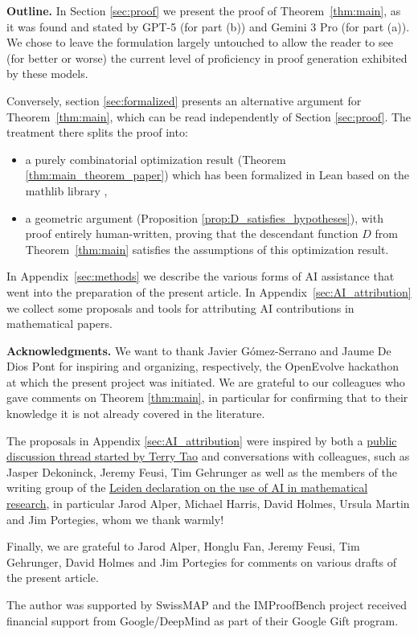 \documentclass[12pt,reqno]{amsart}
\theoremstyle{definition}
\begin{document}
\medskip
\begin{humanparagraph}
\noindent\textbf{Outline.} 
In Section \ref{sec:proof} we present the proof of Theorem~\ref{thm:main}, as it was found and stated by GPT-5 (for part (b)) and Gemini 3 Pro (for part (a)). We chose to leave the formulation largely untouched to allow the reader to see (for better or worse) the current level of proficiency in proof generation exhibited by these models.

Conversely, section \ref{sec:formalized} presents an alternative argument for Theorem~\ref{thm:main}, which can be read independently of Section \ref{sec:proof}. The treatment there splits the proof into:
\begin{itemize}
    \item a purely combinatorial optimization result (Theorem \ref{thm:main_theorem_paper}) which has been formalized in Lean \cite{lean4} based on the mathlib library \cite{mathlib},
    \item a geometric argument (Proposition  \ref{prop:D_satisfies_hypotheses}), with proof entirely human-written, proving that the descendant function $D$ from Theorem~\ref{thm:main} satisfies the assumptions of this optimization result.
\end{itemize}
In Appendix~\ref{sec:methods} we describe the various forms of AI assistance that went into the preparation of the present article. 
{In Appendix~\ref{sec:AI_attribution} we collect some proposals and tools for attributing AI contributions in mathematical papers.}

\medskip
\noindent\textbf{Acknowledgments.} 
We want to thank Javier Gómez-Serrano and Jaume De Dios Pont for inspiring and organizing, respectively, the OpenEvolve hackathon at which the present project was initiated. We are grateful to our colleagues who gave comments on Theorem \ref{thm:main}, in particular for confirming that to their knowledge it is not already covered in the literature. 

The proposals in Appendix \ref{sec:AI_attribution} were inspired by both a \href{https://ai-math.zulipchat.com/#narrow/channel/539992-Web-public-channel---AI-Math/topic/Best.20practices.20for.20incorporating.20AI.20etc.2E.20in.20papers/near/546518354}{public discussion thread started by Terry Tao} and conversations with colleagues, such as Jasper Dekoninck, Jeremy Feusi, Tim Gehrunger as well as the members of the  writing group of the \href{https://www.lorentzcenter.nl/index.php?pntType=ConPagina&id=2150&conBestandId=4187&pntHandler=DownloadAction}{Leiden declaration on the use of AI in mathematical research}, in particular Jarod Alper, Michael Harris, David Holmes, Ursula Martin and Jim Portegies, whom we thank warmly!

Finally, we are grateful to Jarod Alper, Honglu Fan, Jeremy Feusi, Tim Gehrunger, David Holmes and Jim Portegies for comments on various drafts of the present article.


The author was supported by SwissMAP and the  IMProofBench project received financial support from Google/DeepMind as part of their Google Gift program.

\end{humanparagraph}
\end{document}
